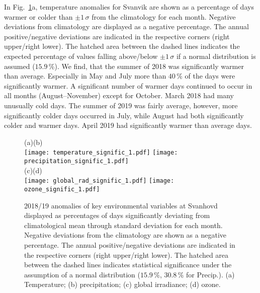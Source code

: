 \documentclass[bg, manuscript]{copernicus}
\begin{document}
In Fig.~\ref{fig:anomalies_svanvik}a, temperature anomalies for Svanvik are shown as a percentage of days warmer or colder than $\pm 1\,\sigma$ from the climatology for each month. Negative deviations from climatology are displayed as a negative percentage. The annual positive/negative deviations are indicated in the respective corners (right upper/right lower). The hatched area between the dashed lines indicates the expected percentage of values falling above/below $\pm 1\,\sigma$ if a normal distribution is assumed ($15.9\,\unit{\%}$). We find, that the summer of 2018 was significantly warmer than average. Especially in May and July more than $40\,\unit{\%}$ of the days were significantly warmer. A significant number of warmer days continued to occur in all months (August--November) except for October. March 2018 had many unusually cold days. The summer of 2019 was fairly average, however, more significantly colder days occurred in July, while August had both significantly colder and warmer days. April 2019 had significantly warmer than average days.

\begin{figure}[t]
  \centering
  (a)\hspace{8.3cm}(b)\\
  \texttt{[image: temperature\_signific\_1.pdf]}
  \texttt{[image: precipitation\_signific\_1.pdf]}\\
  (c)\hspace{8.3cm}(d)\\
  \texttt{[image: global\_rad\_signific\_1.pdf]}
  \texttt{[image: ozone\_signific\_1.pdf]}
  \caption{2018/19 anomalies of key environmental variables at Svanhovd displayed as percentages of days significantly deviating from climatological mean through standard deviation for each month. Negative deviations from the climatology are shown as a negative percentage. The annual positive/negative deviations are indicated in the respective corners (right upper/right lower). The hatched area between the dashed lines indicates statistical significance under the assumption of a normal distribution ($15.9\,\unit{\%}$, $30.8\,\unit{\%}$ for Precip.). (a) Temperature; (b) precipitation; (c) global irradiance; (d) ozone.}
  \label{fig:anomalies_svanvik}
\end{figure}
\end{document}
